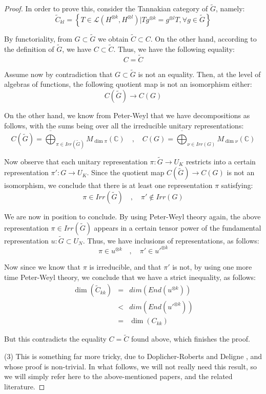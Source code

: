 \documentclass[12pt]{amsbook}
\begin{document}
\begin{proof}
In order to prove this, consider the Tannakian category of $\widetilde{G}$, namely:
$$\widetilde{C}_{kl}=\left\{T\in\mathcal L(H^{\otimes k},H^{\otimes l})\Big|Tg^{\otimes k}=g^{\otimes l}T,\forall g\in\widetilde{G}\right\}$$

By functoriality, from $G\subset\widetilde{G}$ we obtain $\widetilde{C}\subset C$. On the other hand, according to the definition of $\widetilde{G}$, we have $C\subset\widetilde{C}$. Thus, we have the following equality:
$$C=\widetilde{C}$$

Assume now by contradiction that $G\subset\widetilde{G}$ is not an equality. Then, at the level of algebras of functions, the following quotient map is not an isomorphism either:
$$C(\widetilde{G})\to C(G)$$ 

On the other hand, we know from Peter-Weyl that we have decompositions as follows, with the sums being over all the irreducible unitary representations:
$$C(\widetilde{G})=\overline{\bigoplus}_{\pi\in Irr(\widetilde{G})}M_{\dim\pi}(\mathbb C)
\quad,\quad 
C(G)=\overline{\bigoplus}_{\nu\in Irr(G)}M_{\dim\nu}(\mathbb C)$$

Now observe that each unitary representation $\pi:\widetilde{G}\to U_K$ restricts into a certain representation $\pi':G\to U_K$. Since the quotient map $C(\widetilde{G})\to C(G)$ is not an isomorphism, we conclude that there is at least one representation $\pi$ satisfying:
$$\pi\in Irr(\widetilde{G})\quad,\quad \pi'\notin Irr(G)$$

We are now in position to conclude. By using Peter-Weyl theory again, the above representation $\pi\in Irr(\widetilde{G})$ appears in a certain tensor power of the fundamental representation $u:\widetilde{G}\subset U_N$. Thus, we have inclusions of representations, as follows:
$$\pi\in u^{\otimes k}\quad,\quad\pi'\in u'^{\otimes k}$$

Now since we know that $\pi$ is irreducible, and that $\pi'$ is not, by using one more time Peter-Weyl theory, we conclude that we have a strict inequality, as follows:
\begin{eqnarray*}
\dim(\widetilde{C}_{kk})
&=&dim(End(u^{\otimes k}))\\
&<&dim(End(u'^{\otimes k}))\\
&=&\dim(C_{kk})
\end{eqnarray*}

But this contradicts the equality $C=\widetilde{C}$ found above, which finishes the proof.

\medskip

(3) This is something far more tricky, due to Doplicher-Roberts \cite{dro} and Deligne \cite{del}, and whose proof is non-trivial. In what follows, we will not really need this result, so we will simply refer here to the above-mentioned papers, and the related literature.
\end{proof}
\end{document}
